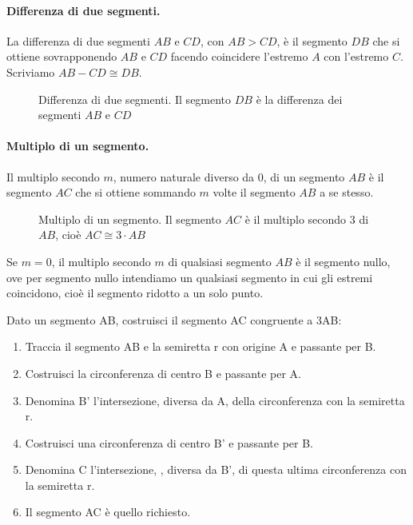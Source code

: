\paragraph{Differenza di due segmenti.} La differenza di due segmenti 
$AB$ e $CD$, con $AB>CD$, è il segmento $DB$ che si ottiene 
sovrapponendo $AB$ e $CD$ facendo coincidere l'estremo $A$ con 
l'estremo $C$. Scriviamo $AB-CD \cong DB$.


\begin{inaccessibleblock}
 \begin{figure}[htb]
\centering
\caption{Differenza di due segmenti. Il segmento $DB$ è la differenza 
dei segmenti $AB$ e $CD$}
\end{figure}
\end{inaccessibleblock}

\paragraph{Multiplo di un segmento.} Il multiplo secondo $m$, numero 
naturale diverso da 0, di un segmento $AB$ è il segmento $AC$ che si 
ottiene sommando $m$ volte il segmento $AB$ a se stesso.

\begin{inaccessibleblock}
 \begin{figure}[htb]
\centering
\caption{Multiplo di un segmento. Il segmento $AC$ è il multiplo 
secondo 3 di $AB$, cioè $AC\cong 3\cdot AB$}
\end{figure}
\end{inaccessibleblock}

Se $m=0$, il multiplo secondo $m$ di qualsiasi segmento $AB$ è il 
segmento nullo, ove per segmento nullo intendiamo un qualsiasi 
segmento in cui gli estremi coincidono, cioè il segmento ridotto a un 
solo punto.

\begin{procedura}
	Dato un segmento AB, costruisci il segmento AC congruente a 3AB:
	\begin{enumerate} [nosep]
		\item 
		Traccia il segmento AB e la semiretta r con origine A e passante per B.
		\item 
		Costruisci la circonferenza di centro B e passante per A.
		\item 
		Denomina B' l'intersezione, diversa da A, della circonferenza con la semiretta r.
		\item 
		Costruisci una circonferenza di centro B' e passante per B.
		\item 
		Denomina C l'intersezione, , diversa da B', di questa ultima circonferenza con la semiretta r.
		\item 
		Il segmento AC è quello richiesto.
	\end{enumerate}
\end{procedura}

